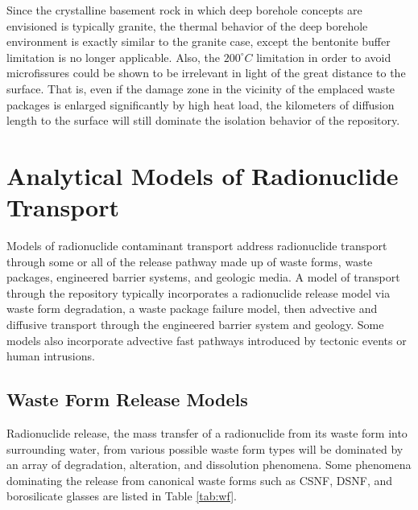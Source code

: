 Since the crystalline basement rock in which deep borehole concepts are 
envisioned is typically granite, the thermal behavior of the deep borehole 
environment is exactly similar to the granite case, except the bentonite buffer 
limitation is no longer applicable.  Also, the $200^{\circ}C$ limitation in 
order to avoid microfissures could  be shown to be irrelevant in light of the 
great distance to the surface. That is, even if the damage zone in the vicinity 
of the emplaced waste packages is enlarged significantly by high heat load, 
the kilometers of diffusion length to the surface will still dominate the 
isolation behavior of the repository. 



\section{Analytical Models of Radionuclide Transport} \label{sec:analytical_nuc}


Models of radionuclide contaminant transport address radionuclide transport 
through some or all of the release pathway made up of waste forms, waste packages, 
engineered barrier systems, and geologic media. A model of transport through 
the repository typically incorporates a radionuclide release model via waste 
form degradation, a waste package failure model, then advective and diffusive 
transport through the engineered barrier system and geology. Some models also 
incorporate advective fast pathways introduced by tectonic events or human 
intrusions.

\subsection{Waste Form Release Models}

Radionuclide release, the mass transfer of a radionuclide from its 
waste form into surrounding water, 
from various possible waste form types will be dominated by 
an array of degradation, alteration, and dissolution phenomena. 
Some phenomena dominating the release from canonical waste forms such as  \gls{CSNF}, 
\gls{DSNF}, and borosilicate glasses are listed in Table \ref{tab:wf}.



